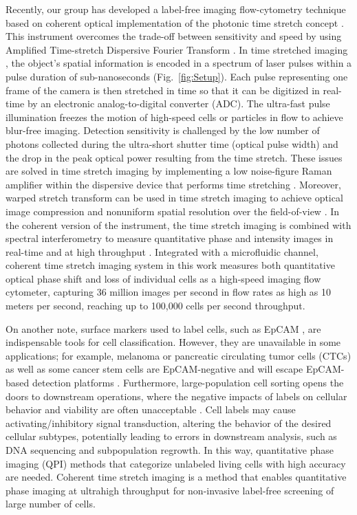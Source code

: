 \documentclass[aps,pra,reprint,longbibliography,superscriptaddress]{revtex4-1}
\begin{document}
Recently, our group has developed a label-free imaging flow-cytometry technique based on coherent optical implementation of the photonic time stretch concept \cite{mahjoubfar2013label}. This instrument overcomes the trade-off between sensitivity and speed by using Amplified Time-stretch Dispersive Fourier Transform \cite{goda2013dispersive, solli2009optical, goda2009theory}. In time stretched imaging \cite{goda2009serial}, the object's spatial information is encoded in a spectrum of laser pulses within a pulse duration of sub-nanoseconds (Fig.~\ref{fig:Setup}). Each pulse representing one frame of the camera is then stretched in time so that it can be digitized in real-time by an electronic analog-to-digital converter (ADC). The ultra-fast pulse illumination freezes the motion of high-speed cells or particles in flow to achieve blur-free imaging. Detection sensitivity is challenged by the low number of photons collected during the ultra-short shutter time (optical pulse width) and the drop in the peak optical power resulting from the time stretch. These issues are solved in time stretch imaging by implementing a low noise-figure Raman amplifier within the dispersive device that performs time stretching \cite{goda2009serial,mahjoubfar2013label,mahjoubfar2013optically}. Moreover, warped stretch transform \cite{jalali2015tailoring} can be used in time stretch imaging to achieve optical image compression and nonuniform spatial resolution over the field-of-view \cite{chen2015optical}. In the coherent version of the instrument, the time stretch imaging is combined with spectral interferometry to measure quantitative phase and intensity images in real-time and at high throughput \cite{mahjoubfar2014label}. Integrated with a microfluidic channel, coherent time stretch imaging system in this work measures both quantitative optical phase shift and loss of individual cells as a high-speed imaging flow cytometer, capturing 36 million images per second in flow rates as high as 10 meters per second, reaching up to 100,000 cells per second throughput.

On another note, surface markers used to label cells, such as EpCAM \cite{gires2009abundance}, are indispensable tools for cell classification. However, they are unavailable in some applications; for example, melanoma or pancreatic circulating tumor cells (CTCs) as well as some cancer stem cells are EpCAM-negative and will escape EpCAM-based detection platforms \cite{kling2012beyond}. Furthermore, large-population cell sorting opens the doors to downstream operations, where the negative impacts of labels on cellular behavior and viability are often unacceptable \cite{boddington2011labeling}. Cell labels may cause activating/inhibitory signal transduction, altering the behavior of the desired cellular subtypes, potentially leading to errors in downstream analysis, such as DNA sequencing and subpopulation regrowth. In this way, quantitative phase imaging (QPI) methods \cite{ikeda2005hilbert,popescu2011quantitative,pham2013real} that categorize unlabeled living cells with high accuracy are needed. Coherent time stretch imaging is a method that enables quantitative phase imaging at ultrahigh throughput for non-invasive label-free screening of large number of cells.
\end{document}
